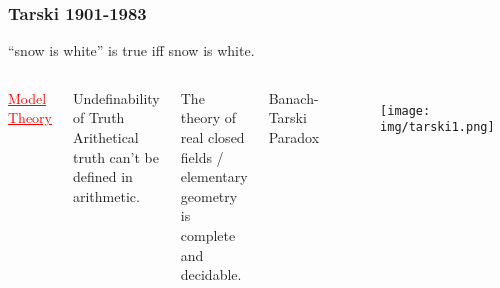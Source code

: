 \documentclass[UTF8,aspectratio=43,11pt,colorlinks,compress,openany]{beamer}%
\begin{document}
\begin{frame}\frametitle{Tarski 1901-1983}\vspace*{-2ex}
\centerline{``snow is white'' is true iff snow is white.}
\begin{center}
\end{center}\vspace*{-3ex}
\begin{columns}
\begin{center}
\textcolor{red}{\underline{Model Theory}}
\end{center}
\begin{block}{Undefinability of Truth}
Arithetical truth can't be defined in arithmetic.
\end{block}
\begin{block}{}
	The theory of real closed fields / elementary geometry is complete and decidable.
\end{block}
\begin{block}{}
	Banach-Tarski Paradox
\end{block}
\begin{figure}
\texttt{[image: img/tarski1.png]}
\end{figure}
\end{columns}
\end{frame}
\end{document}
